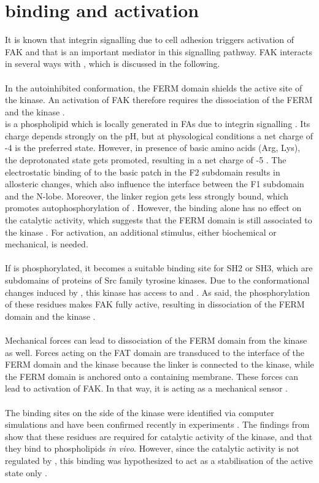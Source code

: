 \section{\pip{} binding and activation}
It is known that integrin signalling due to cell adhesion triggers activation of FAK and that \pip{} is an important mediator in this signalling pathway. FAK interacts in several ways with \pip{}, which is discussed in the following.\\
\\
In the autoinhibited conformation, the FERM domain shields the active site of the kinase. An activation of FAK therefore requires the dissociation of the FERM and the kinase \autocite{structFAK}.\\
\pip{} is a phospholipid which is locally generated in FAs due to integrin signalling \autocite{pip2LocalGeneration}. Its charge depends strongly on the pH, but at physological conditions a net charge of -4 is the preferred state. However, in presence of basic amino acids (Arg, Lys), the deprotonated state gets promoted, resulting in a net charge of -5 \autocite{pip2_minus5}. The electrostatic binding of \pip{} to the basic patch in the F2 subdomain results in allosteric changes, which also influence the interface between the F1 subdomain and the N-lobe. Moreover, the linker region gets less strongly bound, which promotes autophosphorylation of . However, the \pip{} binding alone has no effect on the catalytic activity, which suggests that the FERM domain is still associated to the kinase \autocites{pap001}{pap003}. For activation, an additional stimulus, either biochemical or mechanical, is needed.\\
\\
If  is phosphorylated, it becomes a suitable binding site for SH2 or SH3, which are subdomains of proteins of Src family tyrosine kinases. Due to the conformational changes induced by \pip{}, this kinase has access to  and . As said, the phosphorylation of these residues makes FAK fully active, resulting in dissociation of the FERM domain and the kinase \autocite{pap001}.\\
\\
Mechanical forces can lead to dissociation of the FERM domain from the kinase as well. Forces acting on the FAT domain are transduced to the interface of the FERM domain and the kinase because the linker is connected to the kinase, while the FERM domain is anchored onto a \pip{} containing membrane. These forces can lead to activation of FAK. In that way, it is acting as a mechanical sensor \autocite{pap004}.\\
\\
The binding sites on the side of the kinase were identified via computer simulations \autocite{pap002} and have been confirmed recently in experiments \autocite{pap002Exp}. The findings from \textcite{pap002Exp} show that these residues are required for catalytic activity of the kinase, and that they bind to phospholipids \textit{in vivo}. However, since the catalytic activity is not regulated by \pip{}, this binding was hypothesized to act as a stabilisation of the active state only \autocite{pap002Exp}.
